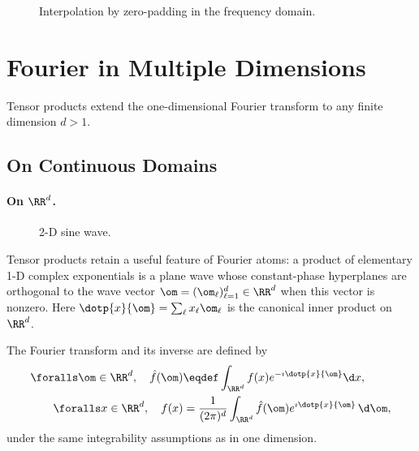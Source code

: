 \begin{figure}[tbp]
\centering
{}
\caption{Interpolation by zero-padding in the frequency domain.}
\label{fig-padding-fourier}
\end{figure}

                                                
                                                
                                                
\section{Fourier in Multiple Dimensions}
\label{sec-fourier-multiple-dim}

Tensor products extend the one-dimensional Fourier transform to any finite dimension $d>1$.


                                                
\subsection{On Continuous Domains}

   
\paragraph{On \texorpdfstring{$\RR^d$}{Euclidean Space}.}

\begin{figure}[tbp]
\centering
{}
\caption{2-D sine wave.}
\label{fig-review-fourier-wave}
\end{figure}
Tensor products retain a useful feature of Fourier atoms: a product of elementary 1-D complex exponentials is a plane wave
whose constant-phase hyperplanes are orthogonal to the wave vector $\om=(\om_\ell)_{\ell=1}^d \in \RR^d$ when this vector is nonzero. Here $\dotp{x}{\om} = \sum_\ell x_\ell \om_\ell$ is the canonical inner product on $\RR^d$.

The Fourier transform and its inverse are defined by
\begin{align*}
	\foralls \om \in \RR^d, \quad \hat f(\om) &\eqdef \int_{\RR^d} f(x) e^{-\imath\dotp{x}{\om}} \d x, \\
	\foralls x \in \RR^d, \quad  f(x) &= \frac{1}{(2\pi)^d} \int_{\RR^d}\hat f(\om)e^{\imath\dotp{x}{\om}}\,\d\om,
\end{align*}
under the same integrability assumptions as in one dimension.


